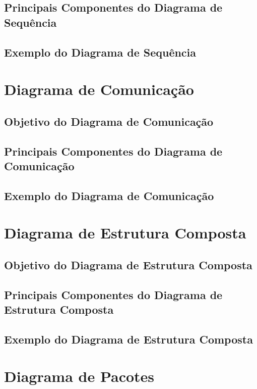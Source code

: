 \documentclass[12pt,openright,oneside,a4paper,
	chapter=TITLE,
	section=TITLE,
	english,brazil]{abntex2}
\begin{document}
\section{Principais Componentes do Diagrama de Sequência}

\section{Exemplo do Diagrama de Sequência}

\chapter{Diagrama de Comunicação}

\section{Objetivo do Diagrama de Comunicação}

\section{Principais Componentes do Diagrama de Comunicação}

\section{Exemplo do Diagrama de Comunicação}

\chapter{Diagrama de Estrutura Composta}

\section{Objetivo do Diagrama de Estrutura Composta}

\section{Principais Componentes do Diagrama de Estrutura Composta}

\section{Exemplo do Diagrama de Estrutura Composta}

\chapter{Diagrama de Pacotes}
\end{document}
